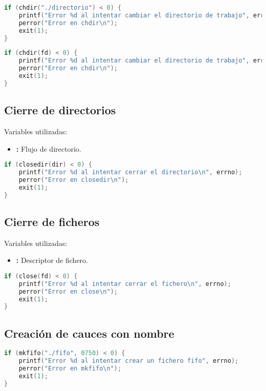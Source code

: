 \begin{lstlisting}[language=C]
if (chdir("./directorio") < 0) {
	printf("Error %d al intentar cambiar el directorio de trabajo", errno);
	perror("Error en chdir\n");
	exit(1);
}

\end{lstlisting}
\begin{lstlisting}[language=C]
if (chdir(fd) < 0) {
	printf("Error %d al intentar cambiar el directorio de trabajo", errno);
	perror("Error en chdir\n");
	exit(1);
}
\end{lstlisting}

\pagebreak

\subsection{Cierre de directorios}

Variables utilizadas:

\begin{itemize}
	\item{}\textbf{:} Flujo de directorio.
\end{itemize}

\begin{lstlisting}[language=C]
if (closedir(dir) < 0) {
	printf("Error %d al intentar cerrar el directorio\n", errno);
	perror("Error en closedir\n");
	exit(1);
}
\end{lstlisting}

\subsection{Cierre de ficheros}

Variables utilizadas:

\begin{itemize}
	\item{}\textbf{:} Descriptor de fichero.
\end{itemize}

\begin{lstlisting}[language=C]
if (close(fd) < 0) {
	printf("Error %d al intentar cerrar el fichero\n", errno);
	perror("Error en close\n");
	exit(1);
}
\end{lstlisting}

\subsection{Creación de cauces con nombre}

\begin{lstlisting}[language=C]
if (mkfifo("./fifo", 0750) < 0) {
	printf("Error %d al intentar crear un fichero fifo", errno);
	perror("Error en mkfifo\n");
	exit(1);
}
\end{lstlisting}

